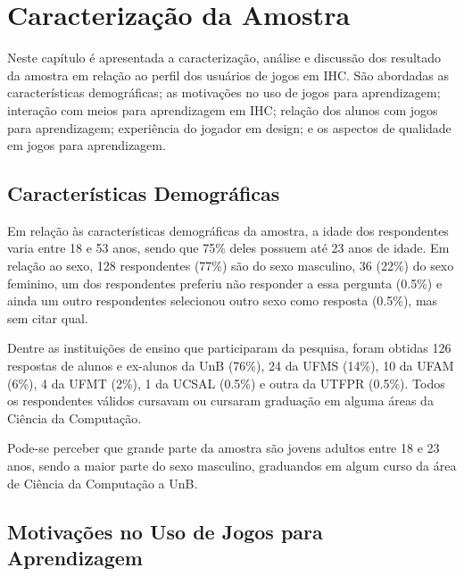 \chapter{Caracterização da Amostra}
\label{chap:result}


Neste capítulo é apresentada a caracterização, análise e discussão dos resultado da amostra em relação ao perfil dos usuários de jogos em IHC. São abordadas as características demográficas; as motivações no uso de jogos para aprendizagem; interação com meios para aprendizagem em IHC; relação dos alunos com jogos para aprendizagem; experiência do jogador em design; e os aspectos de qualidade em jogos para aprendizagem.

\section{Características Demográficas}


Em relação às características demográficas da amostra, a idade dos respondentes varia entre 18 e 53 anos, sendo que 75\% deles possuem até 23 anos de idade. Em relação ao sexo, 128 respondentes (77\%) são do sexo masculino, 36 (22\%) do sexo feminino, um dos respondentes preferiu não responder a essa pergunta (0.5\%) e ainda um outro respondentes selecionou outro sexo como resposta (0.5\%), mas sem citar qual.

Dentre as instituições de ensino que participaram da pesquisa, foram obtidas 126 respostas de alunos e ex-alunos da UnB (76\%), 24 da UFMS (14\%), 10 da UFAM (6\%), 4 da UFMT (2\%), 1 da UCSAL (0.5\%) e outra da UTFPR (0.5\%). Todos os respondentes válidos cursavam ou cursaram graduação em alguma áreas da Ciência da Computação.

Pode-se perceber que grande parte da amostra são jovens adultos entre 18 e 23 anos, sendo a maior parte do sexo masculino, graduandos em algum curso da área de Ciência da Computação a UnB.

\section{Motivações no Uso de Jogos para Aprendizagem}

